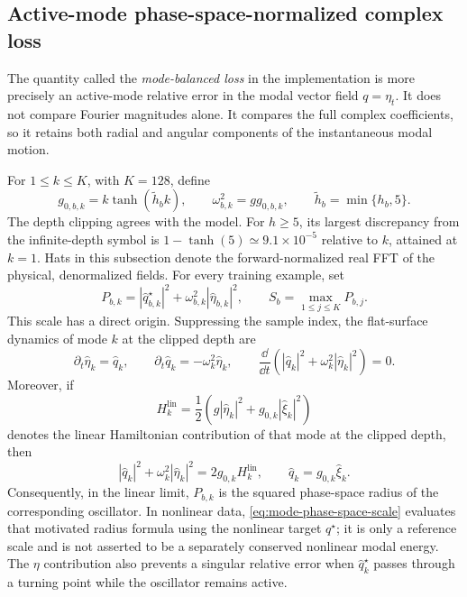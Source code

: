 \subsection{Active-mode phase-space-normalized complex loss}
\label{sec:mode-loss}

The quantity called the \emph{mode-balanced loss} in the implementation is
more precisely an active-mode relative error in the modal vector field
$q=\eta_t$.  It does not compare Fourier magnitudes alone.  It compares the
full complex coefficients, so it retains both radial and angular components
of the instantaneous modal motion.

For $1\leq k\leq K$, with $K=128$, define
\begin{equation}
  g_{0,b,k}=k\tanh(\widetilde h_b k),
  \qquad
  \omega_{b,k}^2=g g_{0,b,k},
  \qquad
  \widetilde h_b=\min\{h_b,5\}.
  \label{eq:mode-dispersion}
\end{equation}
The depth clipping agrees with the model. For $h\geq5$, its largest discrepancy
from the infinite-depth symbol is $1-\tanh(5)\simeq9.1\times10^{-5}$ relative
to $k$, attained at $k=1$. Hats in this subsection denote the
forward-normalized real FFT of the physical, denormalized fields. For every
training example, set
\begin{equation}
  P_{b,k}
  =|\widehat q_{b,k}^\star|^2
   +\omega_{b,k}^2|\widehat\eta_{b,k}|^2,
  \qquad
  S_b=\max_{1\leq j\leq K}P_{b,j}.
  \label{eq:mode-phase-space-scale}
\end{equation}
This scale has a direct origin. Suppressing the sample index, the flat-surface
dynamics of mode $k$ at the clipped depth are
\begin{equation}
  \partial_t\widehat\eta_k=\widehat q_k,
  \qquad
  \partial_t\widehat q_k=-\omega_k^2\widehat\eta_k,
  \qquad
  \frac{\dd}{\dd t}
  \left(|\widehat q_k|^2+\omega_k^2|\widehat\eta_k|^2\right)=0.
  \label{eq:linear-modal-oscillator}
\end{equation}
Moreover, if
\begin{equation}
  H_k^{\mathrm{lin}}
  =\frac12\left(g|\widehat\eta_k|^2
  +g_{0,k}|\widehat\xi_k|^2\right)
\end{equation}
denotes the linear Hamiltonian contribution of that mode at the clipped depth,
then
\begin{equation}
  |\widehat q_k|^2+\omega_k^2|\widehat\eta_k|^2
  =2g_{0,k} H_k^{\mathrm{lin}},
  \qquad \widehat q_k=g_{0,k}\widehat\xi_k.
  \label{eq:mode-scale-hamiltonian}
\end{equation}
Consequently, in the linear limit, $P_{b,k}$ is the squared phase-space radius
of the corresponding oscillator. In nonlinear data,
\eqref{eq:mode-phase-space-scale} evaluates that motivated radius formula using
the nonlinear target $q^\star$; it is only a reference scale and is not asserted
to be a separately conserved nonlinear modal energy. The
$\eta$ contribution also prevents a singular relative error when
$\widehat q_k^\star$ passes through a turning point while the oscillator
remains active.

